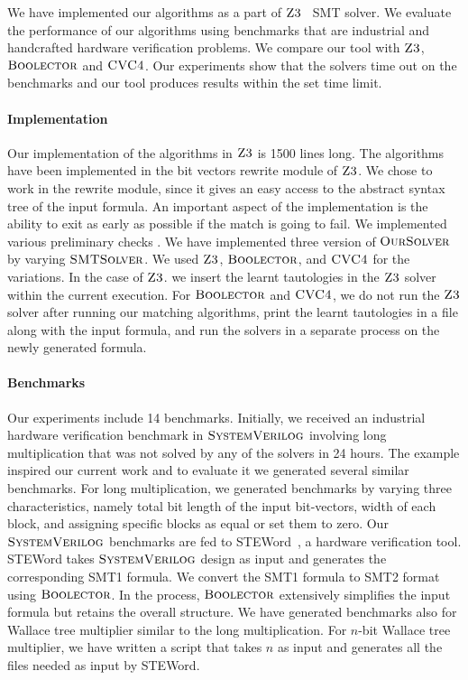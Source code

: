 

We have implemented our algorithms as a part of $\textsc{Z3}$~\cite{z3} SMT solver.
%
 We evaluate the performance of our algorithms using benchmarks that are industrial and handcrafted hardware verification problems.
%
We compare our tool with $\textsc{Z3}$, $\textsc{Boolector}$\cite{boolector} and $\textsc{CVC4}$\cite{cvc4}.
%
Our experiments show that the solvers time out on the benchmarks and our tool produces results within the set time limit.

\paragraph{\bf Implementation}
Our implementation of the algorithms in $\textsc{Z3}$ is 1500 lines long.
%
The algorithms have been implemented in the bit vectors rewrite module of $\textsc{Z3}$.
%
We chose to work in the rewrite module, since it gives an easy access to the abstract syntax tree of the input formula.
%
An important aspect of the implementation is the ability to exit as early as possible if the match is going to fail.
%
We implemented various preliminary checks .
%
We have implemented three version of $\textsc{OurSolver}$ by varying
$\textsc{SMTSolver}$.
%
We used  $\textsc{Z3}$, $\textsc{Boolector}$, and $\textsc{CVC4}$ for the variations. 
%
In the case of $\textsc{Z3}$.
we insert the learnt tautologies in the $\textsc{Z3}$ solver within the current execution.
%
For $\textsc{Boolector}$ and $\textsc{CVC4}$,
we do not run  the $\textsc{Z3}$ solver after running our matching algorithms,
print the learnt tautologies in a file along with the input formula, and
run the solvers in a separate process on the newly generated formula.

\paragraph{\bf Benchmarks}
%
Our experiments include 14 benchmarks.
%
Initially, we received an industrial hardware verification benchmark in $\textsc{SystemVerilog}$ involving long multiplication that was not solved by any of the solvers in 24 hours.
%
The example inspired our current work and to evaluate it we generated several similar benchmarks.
%
For long multiplication, we generated benchmarks by varying three characteristics, namely total bit length of the input bit-vectors, width of each block, and assigning specific blocks as equal or set them to zero.
%
Our $\textsc{SystemVerilog}$ benchmarks are fed to STEWord~\cite{Word-level-Symbolic-Trajectory-Evaluation}, a hardware verification tool.
%
STEWord takes $\textsc{SystemVerilog}$ design as input and generates the corresponding SMT1 formula.
%
We convert the SMT1 formula to SMT2 format using $\textsc{Boolector}$.
%
In the process, $\textsc{Boolector}$ extensively simplifies the input formula but retains the overall structure.
%
We have generated benchmarks also for Wallace tree multiplier similar to the long multiplication.
%
For $n$-bit Wallace tree multiplier, we have written a script that takes $n$ as input and generates all the files needed as input by STEWord.
%


